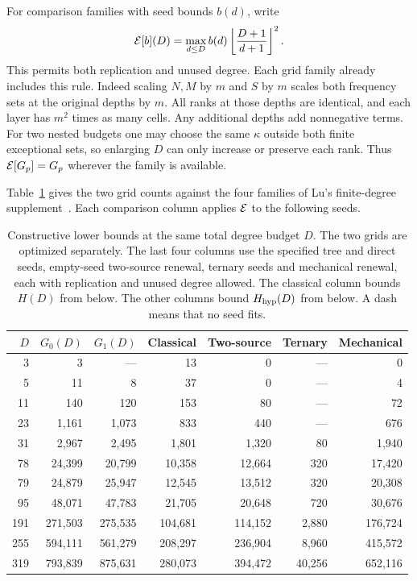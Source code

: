 For comparison families with seed bounds \(b(d)\), write
\[
 \mathcal E[b](D)=\max_{d\le D}b(d)\left\lfloor\frac{D+1}{d+1}\right\rfloor^2 .
\]
This permits both replication and unused degree. Each grid family already includes this rule. Indeed scaling \(N,M\) by \(m\) and \(S\) by \(m\) scales both frequency sets at the original depths by \(m\). All ranks at those depths are identical, and each layer has \(m^2\) times as many cells. Any additional depths add nonnegative terms. For two nested budgets one may choose the same \(\kappa\) outside both finite exceptional sets, so enlarging \(D\) can only increase or preserve each rank. Thus \(\mathcal E[G_p]=G_p\) wherever the family is available.

Table~\ref{tab:finite} gives the two grid counts against the four families of Lu's finite-degree supplement~\cite[\S\S1--3]{supplement}. Each comparison column applies \(\mathcal E\) to the following seeds.

\begin{table}[htbp]
\caption{Constructive lower bounds at the same total degree budget \(D\). The two grids are optimized separately. The last four columns use the specified tree and direct seeds, empty-seed two-source renewal, ternary seeds and mechanical renewal, each with replication and unused degree allowed. The classical column bounds \(H(D)\) from below. The other columns bound \(H_{\mathrm{hyp}}(D)\) from below. A dash means that no seed fits.}\label{tab:finite}
\centering\small
\begin{tabular}{r rr rrrr}
\toprule
 \(D\)&\(G_0(D)\)&\(G_1(D)\)&Classical&Two-source&Ternary&Mechanical\\
\midrule
3&3&---&13&0&---&0\\
5&11&8&37&0&---&4\\
11&140&120&153&80&---&72\\
23&1,161&1,073&833&440&---&676\\
31&2,967&2,495&1,801&1,320&80&1,940\\
78&24,399&20,799&10,358&12,664&320&17,420\\
79&24,879&25,947&12,545&13,512&320&20,308\\
95&48,071&47,783&21,705&20,648&720&30,676\\
191&271,503&275,535&104,681&114,152&2,880&176,724\\
255&594,111&561,279&208,297&236,904&8,960&415,572\\
319&793,839&875,631&280,073&394,472&40,256&652,116\\
\bottomrule
\end{tabular}
\end{table}

